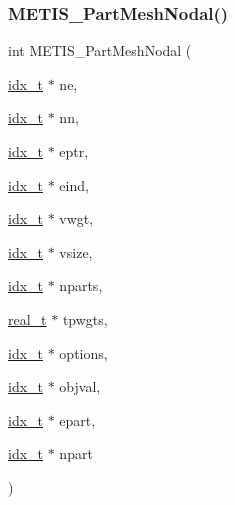 \subsubsection{\texorpdfstring{M\+E\+T\+I\+S\+\_\+\+Part\+Mesh\+Nodal()}{METIS\_PartMeshNodal()}}
{\footnotesize\ttfamily int M\+E\+T\+I\+S\+\_\+\+Part\+Mesh\+Nodal (\begin{DoxyParamCaption}\item[{\hyperlink{a00876_aaa5262be3e700770163401acb0150f52}{idx\+\_\+t} $\ast$}]{ne,  }\item[{\hyperlink{a00876_aaa5262be3e700770163401acb0150f52}{idx\+\_\+t} $\ast$}]{nn,  }\item[{\hyperlink{a00876_aaa5262be3e700770163401acb0150f52}{idx\+\_\+t} $\ast$}]{eptr,  }\item[{\hyperlink{a00876_aaa5262be3e700770163401acb0150f52}{idx\+\_\+t} $\ast$}]{eind,  }\item[{\hyperlink{a00876_aaa5262be3e700770163401acb0150f52}{idx\+\_\+t} $\ast$}]{vwgt,  }\item[{\hyperlink{a00876_aaa5262be3e700770163401acb0150f52}{idx\+\_\+t} $\ast$}]{vsize,  }\item[{\hyperlink{a00876_aaa5262be3e700770163401acb0150f52}{idx\+\_\+t} $\ast$}]{nparts,  }\item[{\hyperlink{a00876_a1924a4f6907cc3833213aba1f07fcbe9}{real\+\_\+t} $\ast$}]{tpwgts,  }\item[{\hyperlink{a00876_aaa5262be3e700770163401acb0150f52}{idx\+\_\+t} $\ast$}]{options,  }\item[{\hyperlink{a00876_aaa5262be3e700770163401acb0150f52}{idx\+\_\+t} $\ast$}]{objval,  }\item[{\hyperlink{a00876_aaa5262be3e700770163401acb0150f52}{idx\+\_\+t} $\ast$}]{epart,  }\item[{\hyperlink{a00876_aaa5262be3e700770163401acb0150f52}{idx\+\_\+t} $\ast$}]{npart }\end{DoxyParamCaption})}

